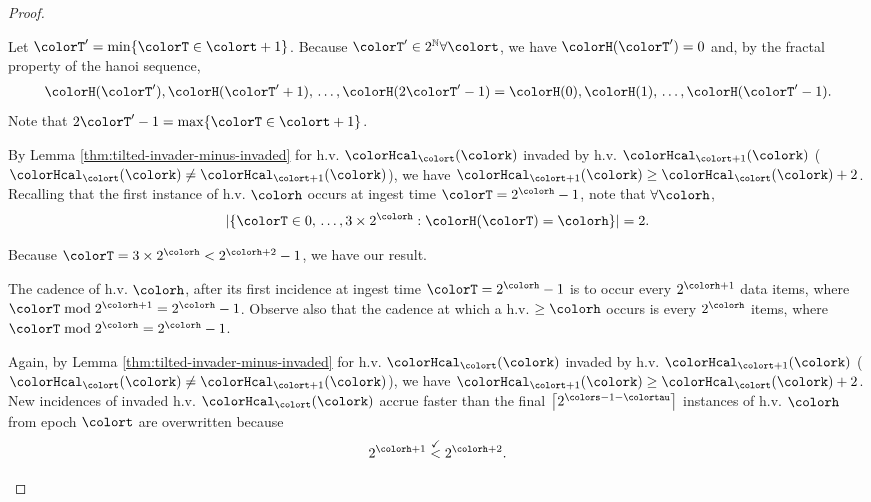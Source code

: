 \begin{proof}
\begin{proofpart}
Let $\colorT' = \min\{\colorT \in \colort + 1\}$.
Because $\colorT' \in 2^{\mathbb{N}} \forall \colort$, we have $\colorH(\colorT') = 0$ and, by the fractal property of the hanoi sequence,
\begin{align*}
\colorH(\colorT'), \colorH(\colorT'+1), \,\ldots, \colorH(2\colorT' - 1) = \colorH(0), \colorH(1), \,\ldots, \colorH(\colorT' - 1).
\end{align*}
Note that $2\colorT' - 1 = \max\{\colorT \in \colort + 1\}$.

By Lemma \ref{thm:tilted-invader-minus-invaded} for h.v. $\colorHcal_{\colort}(\colork)$ invaded by h.v. $\colorHcal_{\colort + 1}(\colork)$ ($\colorHcal_{\colort}(\colork) \neq \colorHcal_{\colort + 1}(\colork)$), we have $\colorHcal_{\colort + 1}(\colork) \geq \colorHcal_{\colort}(\colork) + 2$.
Recalling that the first instance of h.v. $\colorh$ occurs at ingest time $\colorT = 2^{\colorh} - 1$, note that $\forall\colorh$,
\begin{align*}
|\{\colorT \in 0,\,\ldots, 3 \times 2^{\colorh} : \colorH(\colorT) = \colorh\}| = 2.
\end{align*}
\end{proofpart}
Because $\colorT = 3 \times 2^{\colorh} < 2^{\colorh + 2} - 1$, we have our result.

\begin{proofpart}
The cadence of h.v. $\colorh$, after its first incidence at ingest time $\colorT=2^{\colorh} - 1$ is to occur every $2^{\colorh + 1}$ data items, where $\colorT \bmod 2^{\colorh + 1} = 2^{\colorh} - 1$.
Observe also that the cadence at which a h.v. $\geq\colorh$ occurs is every $2^{\colorh}$ items, where $\colorT \bmod 2^{\colorh} = 2^{\colorh} - 1$.

Again, by Lemma \ref{thm:tilted-invader-minus-invaded} for h.v. $\colorHcal_{\colort}(\colork)$ invaded by h.v. $\colorHcal_{\colort + 1}(\colork)$ ($\colorHcal_{\colort}(\colork) \neq \colorHcal_{\colort + 1}(\colork)$), we have $\colorHcal_{\colort + 1}(\colork) \geq \colorHcal_{\colort}(\colork) + 2$.
New incidences of invaded h.v. $\colorHcal_{\colort}(\colork)$ accrue faster than the final $\left\lceil 2^{\colors - 1 - \colortau} \right\rceil$ instances of h.v. $\colorh$ from epoch $\colort$ are overwritten because
\begin{align*}
2^{\colorh + 1} \stackrel{\checkmark}{<} 2^{\colorh + 2}.
\end{align*}
\end{proofpart}

\end{proof}

